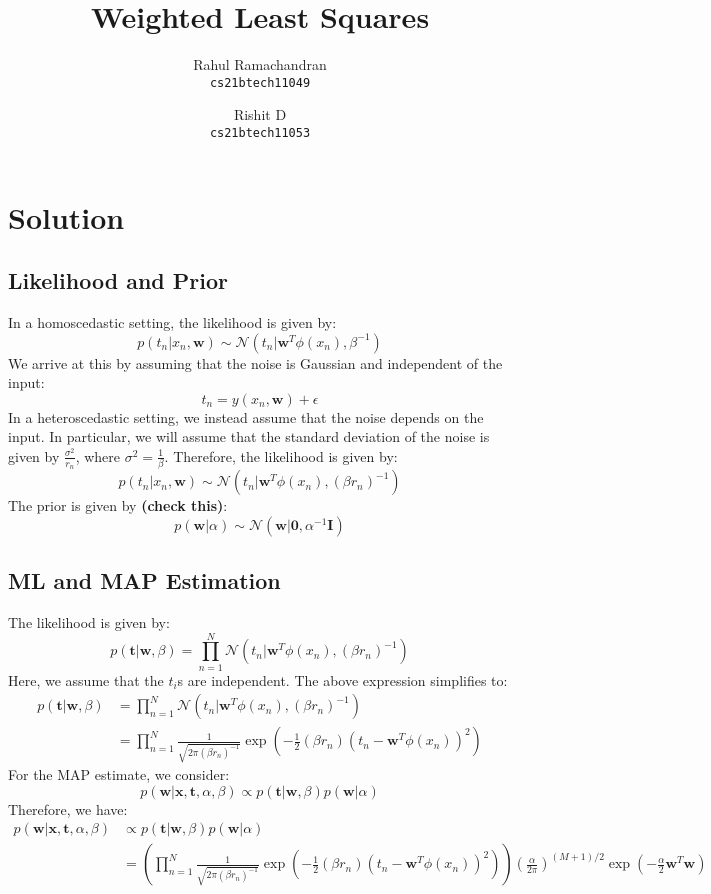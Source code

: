 \documentclass[a4paper, 11pt]{article}
\title{Weighted Least Squares}
\author{
  Rahul Ramachandran\\
  \texttt{cs21btech11049}
  \and
  Rishit D\\
  \texttt{cs21btech11053}
}
\begin{document}
\maketitle
\tableofcontents

\section{Solution}
\subsection{Likelihood and Prior}
In a homoscedastic setting, the likelihood is given by:
$$p(t_n|x_n, \textbf{w}) \sim \mathcal{N}(t_n|\textbf{w}^T \phi(x_n), \beta^{-1})$$
We arrive at this by assuming that the noise is Gaussian and independent of the input:
$$t_n = y(x_n, \textbf{w}) + \epsilon$$
In a heteroscedastic setting, we instead assume that the noise depends on the input. In particular, 
we will assume that the standard deviation of the noise is given by $\frac{\sigma^2}{r_n}$, where $\sigma^2 = \frac{1}{\beta}$.
Therefore, the likelihood is given by:
$$p(t_n|x_n, \textbf{w}) \sim \mathcal{N}(t_n|\textbf{w}^T \phi(x_n), (\beta r_n)^{-1})$$
The prior is given by \textbf{(check this)}:
$$p(\textbf{w}|\alpha) \sim \mathcal{N}(\textbf{w}|\textbf{0}, \alpha^{-1}\textbf{I})$$


\subsection{ML and MAP Estimation}
The likelihood is given by:
$$p(\textbf{t}|\textbf{w}, \beta) = \prod_{n=1}^{N} \mathcal{N}(t_n|\textbf{w}^T \phi(x_n), (\beta r_n)^{-1})$$
Here, we assume that the $t_i$s are independent. 
The above expression simplifies to:
    \begin{align} 
        p(\textbf{t}|\textbf{w}, \beta) &= \prod_{n=1}^{N} \mathcal{N}(t_n|\textbf{w}^T \phi(x_n), (\beta r_n)^{-1}) \label{eq:1} \\
        &= \prod_{n=1}^{N} \frac{1}{\sqrt{2\pi (\beta r_n)^{-1}}} \exp\left(-\frac{1}{2}(\beta r_n)(t_n - \textbf{w}^T \phi(x_n))^2\right) \label{eq:2}
    \end{align}
For the MAP estimate, we consider:
$$ p(\textbf{w}|\textbf{x}, \textbf{t}, \alpha, \beta) \propto p(\textbf{t}|\textbf{w}, \beta) p(\textbf{w}|\alpha)$$
Therefore, we have:
    \begin{align*}
        p(\textbf{w}|\textbf{x}, \textbf{t}, \alpha, \beta) &\propto p(\textbf{t}|\textbf{w}, \beta) p(\textbf{w}|\alpha) \\
        &= \left(\prod_{n=1}^{N} \frac{1}{\sqrt{2\pi (\beta r_n)^{-1}}} \exp\left(-\frac{1}{2}(\beta r_n)(t_n - \textbf{w}^T \phi(x_n))^2\right)\right) \left(\frac{\alpha}{2\pi}\right)^{(M+1)/2} \exp\left(-\frac{\alpha}{2} \textbf{w}^T \textbf{w}\right) \\
    \end{align*}
\end{document}
